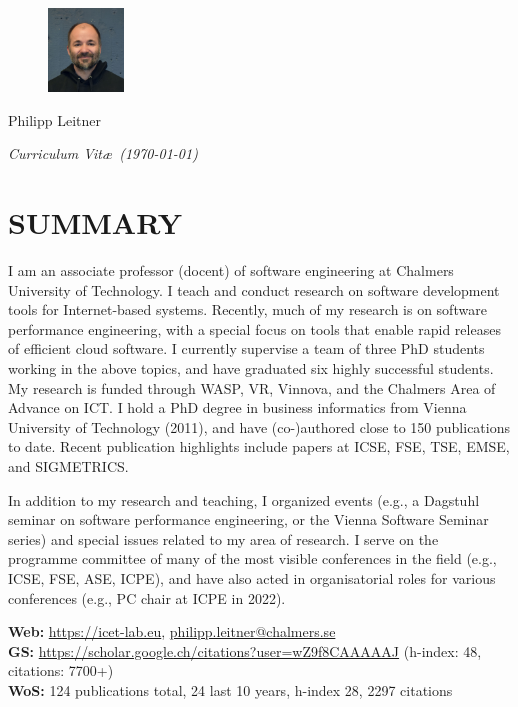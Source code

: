 \documentclass[paper=letter,fontsize=11pt]{scrartcl} %
\newcommand{\MyName}[1]{ %
		\Huge \usefont{OT1}{phv}{b}{n} \hfill #1
		\par \normalsize \normalfont}
\newcommand{\MySlogan}[1]{ %
		\large \usefont{OT1}{phv}{m}{n}\hfill \textit{#1}
		\par \normalsize \normalfont}
\newcommand{\NewPart}[2]{\section*{\uppercase{#1} #2}}
\begin{document}

\begin{figure}
	\vspace*{-2em}
		\includegraphics[width=0.18\textwidth]{wasp_profile.jpg}
\end{figure}

\MyName{Philipp Leitner}
\MySlogan{Curriculum Vit\ae\ (\today)}

\vspace{1cm}

\NewPart{Summary}{}
I am an associate professor (docent) of software engineering at Chalmers University of Technology. I teach and conduct research on software development tools for Internet-based systems. Recently, much of my research is on software performance engineering, with a special focus on tools that enable rapid releases of efficient cloud software. I currently supervise a team of three PhD students working in the above topics, and have graduated six highly successful students. My research is funded through WASP, VR, Vinnova, and the Chalmers Area of Advance on ICT. I hold a PhD degree in business informatics from Vienna University of Technology (2011), and have (co-)authored close to 150 publications to date. Recent publication highlights include papers at ICSE, FSE, TSE, EMSE, and SIGMETRICS.

In addition to my research and teaching, I organized events (e.g., a Dagstuhl seminar on software performance engineering, or the Vienna Software Seminar series) and special issues related to my area of research. I serve on the programme committee of many of the most visible conferences in the field (e.g., ICSE, FSE, ASE, ICPE), and have also acted in organisatorial roles for various conferences (e.g., PC chair at ICPE in 2022).

\noindent \textbf{Web:} \href{https://icet-lab.eu}{https://icet-lab.eu}, \href{mailto:philipp.leitner@chalmers.se}{philipp.leitner@chalmers.se} \\
\textbf{GS:} \href{https://scholar.google.ch/citations?user=wZ9f8CAAAAAJ}{https://scholar.google.ch/citations?user=wZ9f8CAAAAAJ} (h-index: 48, citations: 7700+)\\
\textbf{WoS:} 124 publications total, 24 last 10 years, h-index 28, 2297 citations
\end{document}

